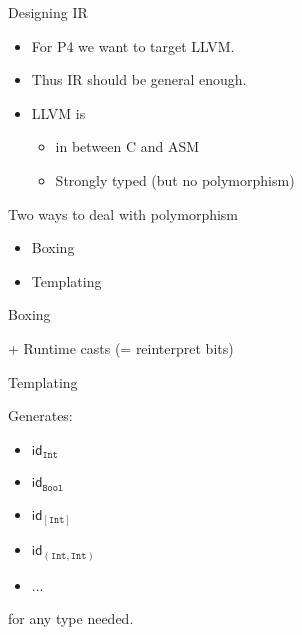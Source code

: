 \documentclass[14pt]{beamer}
\title{\splang}
\author{Wouter Geraedts \and Joshua Moerman}
\institute{Radboud Universiteit Nijmegen}
\date{}
\newcommand{\llvm}{\textsc{LLVM}\xspace}
\begin{document}
\begin{frame}
	\titlepage
\end{frame}

\begin{frame}
	Designing IR
	\bigskip

	\begin{itemize}
		\item For P4 we want to target \llvm.
		\item Thus IR should be general enough.
		\item \llvm is
			\begin{itemize}
				\item in between C and ASM
				\item Strongly typed (but no polymorphism)
			\end{itemize}
	\end{itemize}

	
\end{frame}

\begin{frame}
	Two ways to deal with polymorphism
	
	\begin{itemize}
		\item Boxing
		\item Templating
	\end{itemize}
\end{frame}

\begin{frame}
	Boxing
	\bigskip
	
	
	+ Runtime casts (= reinterpret bits)
\end{frame}

\begin{frame}
	Templating
	\bigskip
	
	
	Generates:
	\begin{itemize}
		\item $\mathsf{id}_{\mathtt{Int}}$
		\item $\mathsf{id}_{\mathtt{Bool}}$
		\item $\mathsf{id}_{[\mathtt{Int}]}$
		\item $\mathsf{id}_{(\mathtt{Int}, \mathtt{Int})}$
		\item ...
	\end{itemize}
	
	for any type needed.
\end{frame}
\end{document}

